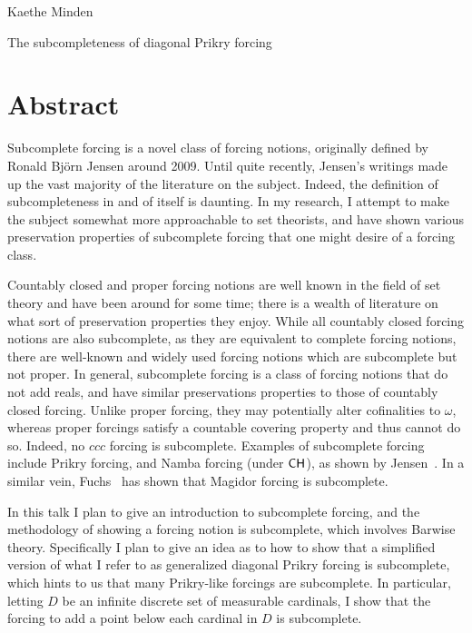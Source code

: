 \documentclass{amsart}
\newcommand{\CH}{\textup{\textsf{CH}}}
\begin{document}
Kaethe Minden

The subcompleteness of diagonal Prikry forcing
\section*{Abstract}
Subcomplete forcing is a novel class of forcing notions, originally defined by Ronald Bj\"orn Jensen around 2009. Until quite recently, Jensen's writings made up the vast majority of the literature on the subject. Indeed, the definition of subcompleteness in and of itself is daunting. In my research, I attempt to make the subject somewhat more approachable to set theorists, and have shown various preservation properties of subcomplete forcing that one might desire of a forcing class. 

Countably closed and proper forcing notions are well known in the field of set theory and have been around for some time; there is a wealth of literature on what sort of preservation properties they enjoy. While all countably closed forcing notions are also subcomplete, as they are equivalent to complete forcing notions, there are well-known and widely used forcing notions which are subcomplete but not proper. In general, subcomplete forcing is a class of forcing notions that do not add reals, and have similar preservations properties to those of countably closed forcing. Unlike proper forcing, they may potentially alter cofinalities to $\omega$, whereas proper forcings satisfy a countable covering property and thus cannot do so. Indeed, no $ccc$ forcing is subcomplete.
Examples of subcomplete forcing include Prikry forcing, and Namba forcing (under $\CH$), as shown by Jensen~\cite[Section 3.3]{Jensen:2012fr}. 
In a similar vein, Fuchs~\cite{Fuchs:2017Magidor} has shown that Magidor forcing is subcomplete. 

In this talk I plan to give an introduction to subcomplete forcing, and the methodology of showing a forcing notion is subcomplete, which involves Barwise theory. Specifically I plan to give an idea as to how to show that a simplified version of what I refer to as generalized diagonal Prikry forcing is subcomplete, which hints to us that many Prikry-like forcings are subcomplete. In particular, letting $D$ be an infinite discrete set of measurable cardinals, I show that the forcing to add a point below each cardinal in $D$ is subcomplete. 



\end{document}
